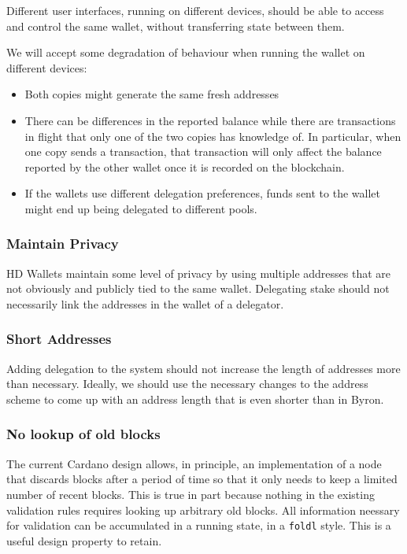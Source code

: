 \documentclass[11pt,a4paper]{article}
\begin{document}
Different user interfaces, running on different devices, should be able
to access and control the same wallet, without transferring state
between them.

We will accept some degradation of behaviour when running the wallet on
different devices:

\begin{itemize}
\item
  Both copies might generate the same fresh addresses
\item
  There can be differences in the reported balance while there are
  transactions in flight that only one of the two copies has knowledge
  of. In particular, when one copy sends a transaction, that transaction
  will only affect the balance reported by the other wallet once it is
  recorded on the blockchain.
\item
  If the wallets use different delegation preferences, funds sent to the
  wallet might end up being delegated to different pools.
\end{itemize}

\subsubsection{Maintain Privacy}\label{maintain-privacy}

HD Wallets maintain some level of privacy by using multiple addresses
that are not obviously and publicly tied to the same wallet. Delegating
stake should not necessarily link the addresses in the wallet of a
delegator.

\subsubsection{Short Addresses}\label{short-addresses}

Adding delegation to the system should not increase the length of
addresses more than necessary. Ideally, we should use the necessary
changes to the address scheme to come up with an address length that is
even shorter than in Byron.

\subsubsection{No lookup of old blocks}\label{no-lookup-of-old-blocks}

The current Cardano design allows, in principle, an implementation of a
node that discards blocks after a period of time so that it only needs
to keep a limited number of recent blocks. This is true in part because
nothing in the existing validation rules requires looking up arbitrary
old blocks. All information neessary for validation can be accumulated
in a running state, in a \texttt{foldl} style. This is a useful design
property to retain.
\end{document}
